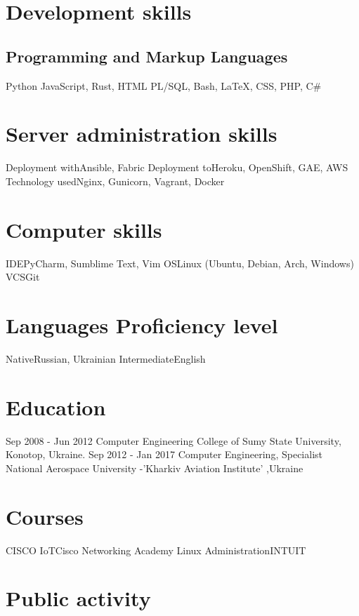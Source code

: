 \documentclass[11pt,a4paper]{moderncv}
\begin{document}
	\section{Development skills}
	\subsection{Programming and Markup Languages}
	{Python}
    {JavaScript, Rust, HTML}
	{PL/SQL, Bash, LaTeX, CSS, PHP, C#}

	\section{Server administration skills}
	\cvline
	{Deployment with}{Ansible, Fabric}
	\cvline
	{Deployment to}{Heroku, OpenShift, GAE, AWS}
	\cvline
	{Technology used}{Nginx, Gunicorn, Vagrant, Docker}
	
	\section{Computer skills}
	\cvline
	{IDE}{PyCharm, Sumblime Text, Vim}
	\cvline
	{OS}{Linux (Ubuntu, Debian, Arch, Windows)}
	\cvline
	{VCS}{Git}

	\section{Languages Proficiency level}
	\cvline
	{Native}{Russian, Ukrainian}
	\cvline
	{Intermediate}{English}
	
	\section{Education}
	\cventry
	{Sep 2008 - Jun 2012}
	{Computer Engineering}
	{College of Sumy State University, Konotop, Ukraine.}
	{}{}{}
	\cventry
	{Sep 2012 - Jan 2017}
	{Computer Engineering, Specialist}
	{National Aerospace University -'Kharkiv Aviation Institute' ,Ukraine}
	{}{}{}
	
	\section{Courses}
	\cvline
	{CISCO IoT}{Cisco Networking Academy}
	\cvline
	{Linux Administration}{INTUIT}
	
	\section{Public activity}
\end{document}

